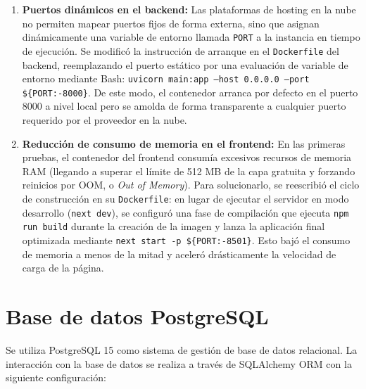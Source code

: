 \documentclass[12pt,a4paper,oneside]{report}
\begin{document}
\begin{enumerate}
    \item \textbf{Puertos dinámicos en el backend:} Las plataformas de hosting en la nube no permiten mapear puertos fijos de forma externa, sino que asignan dinámicamente una variable de entorno llamada \texttt{PORT} a la instancia en tiempo de ejecución. Se modificó la instrucción de arranque en el \texttt{Dockerfile} del backend, reemplazando el puerto estático por una evaluación de variable de entorno mediante Bash: \texttt{uvicorn main:app --host 0.0.0.0 --port \$\{PORT:-8000\}}. De este modo, el contenedor arranca por defecto en el puerto 8000 a nivel local pero se amolda de forma transparente a cualquier puerto requerido por el proveedor en la nube.
    \item \textbf{Reducción de consumo de memoria en el frontend:} En las primeras pruebas, el contenedor del frontend consumía excesivos recursos de memoria RAM (llegando a superar el límite de 512 MB de la capa gratuita y forzando reinicios por OOM, o \textit{Out of Memory}). Para solucionarlo, se reescribió el ciclo de construcción en su \texttt{Dockerfile}: en lugar de ejecutar el servidor en modo desarrollo (\texttt{next dev}), se configuró una fase de compilación que ejecuta \texttt{npm run build} durante la creación de la imagen y lanza la aplicación final optimizada mediante \texttt{next start -p \$\{PORT:-8501\}}. Esto bajó el consumo de memoria a menos de la mitad y aceleró drásticamente la velocidad de carga de la página.
\end{enumerate}

\section{Base de datos PostgreSQL}

Se utiliza PostgreSQL 15 como sistema de gestión de base de datos relacional. La interacción con la base de datos se realiza a través de SQLAlchemy ORM con la siguiente configuración:
\end{document}
